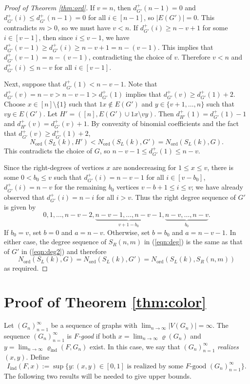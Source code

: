 \documentclass[11pt]{article}
\newcommand{\ord}{{\operatorname{ord}}}
\newcommand{\ind}{{\operatorname{ind}}}
\theoremstyle{definition}
\begin{document}
\begin{proof}[Proof of Theorem \ref{thm:ord}]
    If $v=n$, then $d^+_{G'} (n-1) =0$ and $d^+_{G'} (i) \le d^+_{G'} (n-1) = 0$ for all $i \in [n-1]$, so $|E(G')| = 0$. This contradicts $m>0$, so we must have $v < n$. If  $d^+_{G'} (i) \geq n-v +1$ for some $i \in [v-1]$, then since $i \leq v-1$, we have $d^+_{G'} (v-1) \geq d^+_{G'} (i) \ge n-v+1 = n - (v - 1)$. This implies that $d^+_{G'}(v-1)=n-(v-1)$, contradicting the choice of $v$. Therefore
    $v < n$ and  $d^+_{G'} (i)\le  n-v$ for all $i \in [v-1]$. 
    
    Next, suppose that $d^+_{G'} (1) < n-v-1$. Note that $d^+_{G'} (v) = n-v > n-v-1 > d^+_{G'} (1)$ implies that $d^+_{G'} (v) \ge d^+_{G'} (1) + 2$. Choose $x \in [n]\setminus \{ 1 \}$ such that $1x \notin E(G')$ and $y \in \{ v+1, \ldots, n \}$ such that $vy \in E(G')$. Let $H' = ([n], E(G') \cup 1x \setminus vy)$. Then $d^+_{H'} (1)=d^+_{G'} (1) - 1$ and $d^+_{H'} (v)=d^+_{G'} (v) + 1$. By convexity of  binomial coefficients and the fact that $d^+_{G'} (v) \geq d^+_{G'} (1)+2$, 
    \[N_\ord (S_L (k), H') < N_\ord (S_L (k), G') = N_\ord (S_L (k), G).\]
    This contradicts the choice of $G$, so $n-v-1\le d^+_{G'} (1) \le n-v$.
    
    Since the right-degrees of vertices $x$ are nondecreasing for $1\le x \le v$,  there is some $0 < b_0 \le v$ such that $d^{+}_{G'}(i)= n-v - 1$ for all $i \in [v-b_0]$, $d^{+}_{G'}(i)= n-v$ for the remaining $b_0$ vertices $v-b+1 \le i \le v$; we have already observed that $d^{+}_{G'}(i)= n-i$ for all $i > v$. Thus the right degree sequence of $G'$ is given by \begin{equation}\label{eqn:deg2}
        0,1,\ldots, n-v-2, \underbrace{n-v-1, \ldots, n-v-1}_{v+1-b_0}, \underbrace{n-v, \ldots, n-v}_{b_0}.
    \end{equation} If $b_0 = v$, set $b=0$ and $a=n-v$. Otherwise, set $b = b_0$ and $a = n - v- 1$. In either case, the degree sequence of $S_R (n,m)$ in (\ref{eqn:deg}) is the same as that of $G'$ in (\ref{eqn:deg2}) and therefore 
    \[N_\ord (S_L (k), G) 
    = N_\ord (S_L (k), G')
    = N_\ord (S_L (k), S_R (n,m))\] as required.
\end{proof}

\section{Proof of Theorem \ref{thm:color}}\label{sec:color}

Let $(G_n)_{n=1}^\infty$ be a sequence of graphs with $\lim_{n \to \infty} |V(G_n)| = \infty$. The sequence $(G_n)_{n=1}^\infty$ is {\em $F$-good} if both  $x = \lim_{n \to \infty} \varrho (G_n)$  and $y = \lim_{n\to \infty} \varrho_\ind (F, G_n)$ exist. In this case, we say that $(G_n)_{n=1}^\infty$ {\em realizes} $(x,y)$. Define \[ I_{\ind} (F, x) := \sup \{ y : (x,y) \in [0,1] \text{ is realized by some $F$-good } (G_n)_{n=1}^\infty \}. \] 
The following two results will be needed to give upper bounds.
\end{document}
